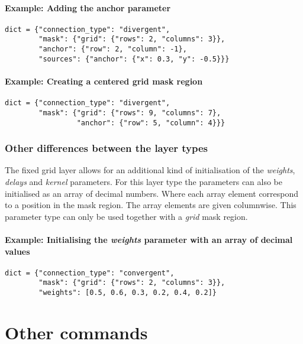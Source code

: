 \documentclass{article}
\begin{document}
\paragraph{Example: Adding the anchor parameter}

\begin{verbatim}
dict = {"connection_type": "divergent",
        "mask": {"grid": {"rows": 2, "columns": 3}}, 
        "anchor": {"row": 2, "column": -1},
        "sources": {"anchor": {"x": 0.3, "y": -0.5}}}
\end{verbatim}

\paragraph{Example: Creating a centered grid mask region}

\begin{verbatim}
dict = {"connection_type": "divergent",
        "mask": {"grid": {"rows": 9, "columns": 7}, 
                 "anchor": {"row": 5, "column": 4}}}
\end{verbatim}

\subsubsection{Other differences between the layer types}

The fixed grid layer allows for an additional kind of initialisation of the \emph{weights}, \emph{delays} and \emph{kernel} parameters. For this layer type the parameters can also be initialised as an array of decimal numbers. Where each array element correspond to a position in the mask region. The array elements are given columnwise. This parameter type can only be used together with a \emph{grid} mask region.

\paragraph{Example: Initialising the \emph{weights} parameter with an array of decimal values}

\begin{verbatim}
dict = {"connection_type": "convergent",
        "mask": {"grid": {"rows": 2, "columns": 3}},
        "weights": [0.5, 0.6, 0.3, 0.2, 0.4, 0.2]}
\end{verbatim}

\section{Other commands}
\end{document}
